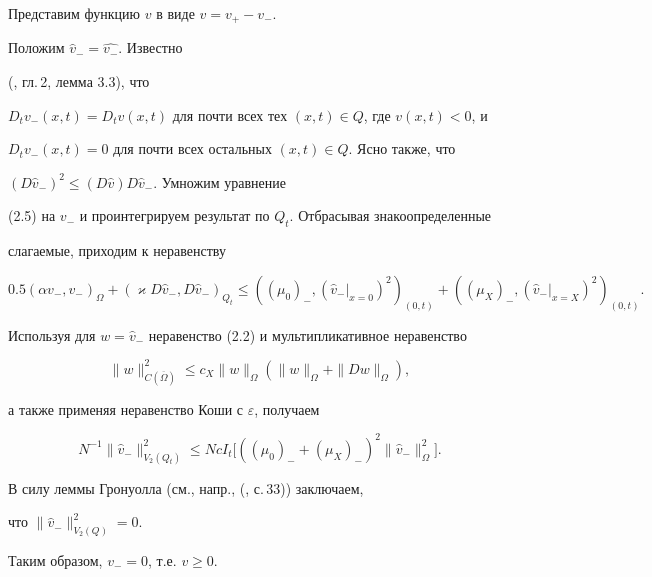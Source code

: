 \documentclass[12pt]{article}
\theoremstyle{plain} %
\theoremstyle{definition}
\numberwithin{equation}{section}
\begin{document}
\begin{pf} Представим функцию $v$ в виде $v=v_+-v_-$.


Положим $\widehat v_-=\widehat{v_-}$. Известно


(\cite{Lad2}, гл.\,2, лемма 3.3), что


$D_t v_-(x,t)= D_tv(x,t)$ для почти всех тех $(x,t)\in Q$, где $v(x,t)<0$, и


$D_t v_-(x,t)= 0$ для почти всех остальных $(x,t)\in Q$. Ясно также, что


$(D\widehat v_-)^2\le (D\widehat v)D\widehat v_-$. Умножим уравнение


(2.5) на $v_-$ и проинтегрируем результат по $Q_t$. Отбрасывая знакоопределенные


слагаемые, приходим к неравенству


$$


0.5(\alpha v_-, v_-)_\Omega +


(\varkappa D\widehat v_-,D\widehat v_-)_{Q_t}\le


((\mu_0)_-, (\widehat v_-|_{x=0})^2)_{(0,t)}+


((\mu_X)_-, (\widehat v_-|_{x=X})^2)_{(0,t)}.


$$


Используя для $w=\widehat v_-$ неравенство (2.2) и мультипликативное неравенство


\begin{equation}


\|w\|^2_{C(\overline\Omega)}\le


c_X \|w\|_\Omega(\|w\|_\Omega +\|Dw\|_\Omega),


\end{equation}


а также применяя неравенство Коши с $\varepsilon$, получаем


$$


N^{-1}\|\widehat v_-\|^2_{V_2(Q_t)}\le


Nc I_t\bigl[((\mu_0)_-+(\mu_X)_-)^2


\|\widehat v_-\|_{\Omega}^2\bigr].


$$


В силу леммы Гронуолла (см., напр., (\cite{Ant}, с.\,33)) заключаем,


что $\|\widehat v_-\|^2_{V_2(Q)}=0$.


Таким образом, $v_-=0$, т.е. $v\ge 0$.


\end{pf}
\end{document}
